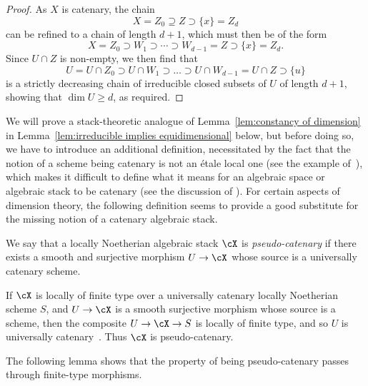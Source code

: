 \begin{proof}
	As $X$ is catenary, the chain
	$$X = Z_0 \supseteq Z \supset \{x\} = Z_d $$
	can be refined to a chain of length $d+1$, which must then
	be of the form
	$$X = Z_0 \supset W_1 \supset \cdots \supset W_{d-1} = Z \supset \{x\} = Z_d.$$
	Since $U\cap Z$ is non-empty, we then find that
	$$U = U \cap Z_0 \supset U \cap W_1\supset \dots \supset U\cap W_{d-1}
	= U\cap Z \supset \{u\}$$
	is a strictly decreasing chain of irreducible closed subsets
	of $U$ of length $d+1$, showing that $\dim U \geq d$,
	as required.
\end{proof}

We will prove a stack-theoretic analogue
of Lemma~\ref{lem:constancy of dimension} in Lemma~\ref{lem:irreducible
	implies equidimensional} below,
but before doing so, we have to introduce an additional definition,
necessitated by the fact that the notion of a scheme being catenary
is not an \'etale local one
(see
the example
of~\cite[\href{http://stacks.math.columbia.edu/tag/0355}{Tag 0355}]{stacks-project}),
which makes it difficult to define what it means for an algebraic
space or algebraic stack to be catenary
(see the discussion of \cite[p.~3]{MR3351957}).
For certain aspects of dimension theory, the following 
definition seems to provide a good substitute for the missing 
notion of a catenary algebraic stack.

\begin{adf}
	We say that a locally Noetherian algebraic stack $\cX$ 
	is {\em pseudo-catenary} if there exists a smooth
	and surjective morphism $U \to \cX$ whose source is
	a universally catenary scheme.
\end{adf}

\begin{aexample}
	If $\cX$ is locally of finite type over a universally
	catenary locally Noetherian scheme $S$,
	and $U\to \cX$ is a smooth surjective morphism
	whose source is a scheme, then the composite 
	$U \to \cX \to S$ is locally of finite type,
	and so $U$ is universally
	catenary~\cite[\href{http://stacks.math.columbia.edu/tag/02J9}{Tag 02J9}]{stacks-project}.   Thus $\cX$ is pseudo-catenary.
\end{aexample}

The following lemma shows that the property of being pseudo-catenary
passes through finite-type morphisms.

